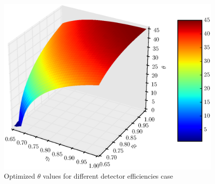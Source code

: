 \documentclass[11pt]{article}
\begin{document}
\begin{figure}[h]
\includegraphics[scale=0.7]{theta3d.eps}
\caption{Optimized $\theta$ values for different detector efficiencies case}
\label{fig:theta_opt_3d}
\end{figure}
\end{document}
